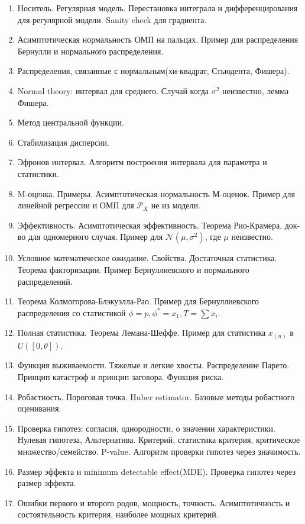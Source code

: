 \begin{enumerate}
	\item Носитель. Регулярная модель. Перестановка интеграла и дифференцирования для регулярной модели. Sanity check для градиента.
	\item Асимптотическая нормальность ОМП на пальцах. Пример для распределения Бернулли и нормального распределения.
	\item Распределения, связанные с нормальным(хи-квадрат, Стьюдента, Фишера).
	\item Normal theory: интервал для среднего. Случай когда $\sigma^2$ неизвестно, лемма Фишера.
	\item Метод центральной функции.
	\item Стабилизация дисперсии.
	\item Эфронов интервал. Алгоритм построения интервала для параметра и статистики.

	\item M-оценка. Примеры. Асимптотическая нормальность М-оценок. Пример для линейной регрессии и ОМП для $\mathcal P_X$ не из модели.
	\item Эффективность. Асимптотическая эффективность. Теорема Рио-Крамера, док-во для одномерного случая. Пример для $\mathcal N(\mu, \sigma^2)$, где $\mu$ неизвестно.
	\item Условное математическое ожидание. Свойства. Достаточная статистика. Теорема факторизации. Пример Бернуллиевского и нормального распределений.
	\item Теорема Колмогорова-Блэкуэлла-Рао. Пример для Бернуллиевского распределения со статистикой $\phi = p, \phi^*= x_1, T = \sum x_i$.
	\item Полная статистика. Теорема Лемана-Шеффе. Пример для статистика $x_{(n)}$ в $U([0, \theta])$.
	\item Функция выживаемости. Тяжелые и легкие хвосты. Распределение Парето. Принцип катастроф и принцип заговора. Функция риска.
	\item Робастность. Пороговая точка. Huber estimator. Базовые методы робастного оценивания.
	
	\item Проверка гипотез: согласия, однородности, о значении характеристики. Нулевая гипотеза, Альтернатива. Критерий, статистика критерия, критическое множество/семейство. P-value. Алгоритм проверки гипотез через значимость.
	\item Размер эффекта и minimum detectable effect(MDE). Проверка гипотез через размер эффекта.
	\item Ошибки первого и второго родов, мощность, точность. Асимптотичность и состоятельность критерия, наиболее мощных критерий.


\end{enumerate}
